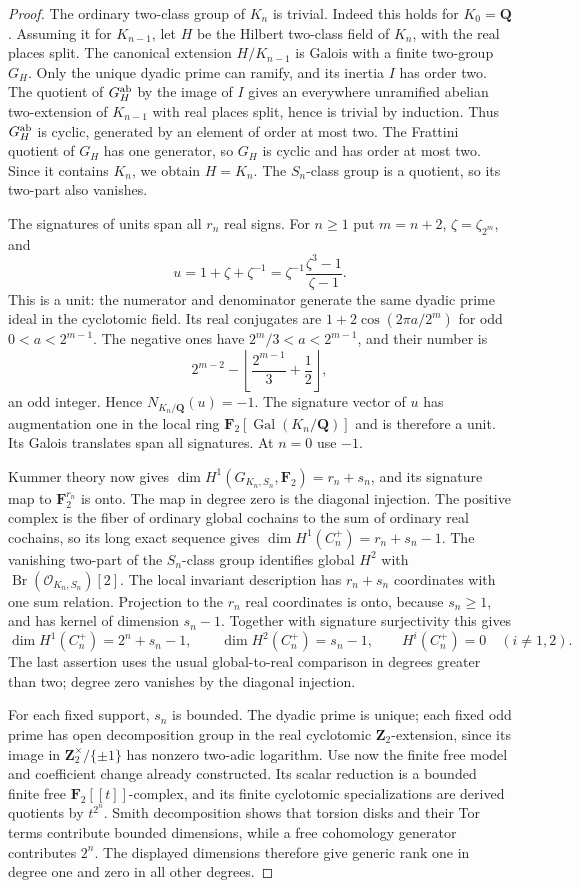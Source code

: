 \documentclass[11pt]{article}
\theoremstyle{definition}
\theoremstyle{remark}
\begin{document}
\begin{proof}
The ordinary two-class group of $K_n$ is trivial. Indeed this holds
for $K_0=\mathbf Q$. Assuming it for $K_{n-1}$, let $H$ be the
Hilbert two-class field of $K_n$, with the real places split.
The canonical extension $H/K_{n-1}$ is Galois with a finite
two-group $G_H$. Only the unique dyadic prime can ramify, and its
inertia $I$ has order two. The quotient of $G_H^{\rm ab}$ by the image
of $I$ gives an everywhere unramified abelian two-extension of
$K_{n-1}$ with real places split, hence is trivial by induction.
Thus $G_H^{\rm ab}$ is cyclic, generated by an element of order at most
two. The Frattini quotient of $G_H$ has one generator, so $G_H$ is cyclic and
has order at most two. Since it contains $K_n$, we obtain $H=K_n$.
The $S_n$-class group is a quotient, so its two-part also vanishes.

The signatures of units span all $r_n$ real signs. For $n\ge1$ put
$m=n+2$, $\zeta=\zeta_{2^m}$, and
\[
 u=1+\zeta+\zeta^{-1}
   =\zeta^{-1}\frac{\zeta^3-1}{\zeta-1}.
\]
This is a unit: the numerator and denominator generate the same
dyadic prime ideal in the cyclotomic field. Its real conjugates are
$1+2\cos(2\pi a/2^m)$ for odd $0<a<2^{m-1}$.
The negative ones have $2^m/3<a<2^{m-1}$, and their number is
\[
 2^{m-2}-\left\lfloor\frac{2^{m-1}}3+\frac12\right\rfloor,
\]
an odd integer. Hence $N_{K_n/\mathbf Q}(u)=-1$.
The signature vector of $u$ has augmentation one in the local ring
$\mathbf F_2[\operatorname{Gal}(K_n/\mathbf Q)]$ and is therefore
a unit. Its Galois translates span all signatures. At $n=0$ use $-1$.

Kummer theory now gives
$\dim H^1(G_{K_n,S_n},\mathbf F_2)=r_n+s_n$, and its signature map
to $\mathbf F_2^{r_n}$ is onto. The map in degree zero is the diagonal
injection. The positive complex is the fiber of ordinary global
cochains to the sum of ordinary real cochains, so its long exact
sequence gives $\dim H^1(C_n^+)=r_n+s_n-1$.
The vanishing two-part of the $S_n$-class group identifies global
$H^2$ with $\operatorname{Br}(\mathcal O_{K_n,S_n})[2]$.
The local invariant description has $r_n+s_n$ coordinates with one
sum relation. Projection to the $r_n$ real coordinates is onto,
because $s_n\ge1$, and has kernel of dimension $s_n-1$.
Together with signature surjectivity this gives
\[
 \dim H^1(C_n^+)=2^n+s_n-1,\qquad
 \dim H^2(C_n^+)=s_n-1,
 \qquad H^i(C_n^+)=0\quad(i\ne1,2).
\]
The last assertion uses the usual global-to-real comparison in
degrees greater than two; degree zero vanishes by the diagonal injection.

For each fixed support, $s_n$ is bounded. The dyadic prime is unique;
each fixed odd prime has open decomposition group in the real
cyclotomic $\mathbf Z_2$-extension, since its image in
$\mathbf Z_2^\times/\{\pm1\}$ has nonzero two-adic logarithm.
Use now the finite free model and coefficient change already constructed.
Its scalar reduction is a bounded finite free $\mathbf F_2[[t]]$-complex,
and its finite cyclotomic specializations are derived quotients by
$t^{2^n}$. Smith decomposition shows that torsion disks and their Tor
terms contribute bounded dimensions, while a free cohomology generator
contributes $2^n$. The displayed dimensions therefore give generic
rank one in degree one and zero in all other degrees.


\end{proof}
\end{document}
